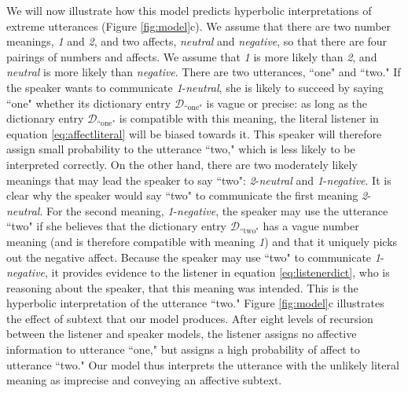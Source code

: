 \documentclass{article} %
\newcommand{\dictionary}{\ensuremath{\mathcal{D}}\xspace}
\begin{document}
We will now illustrate how this model predicts hyperbolic interpretations of extreme utterances (Figure \ref{fig:model}c). We assume that there are two number meanings, \emph{1} and \emph{2}, and two affects, \emph{neutral} and \emph{negative}, so that there are four pairings of numbers and affects. We assume that \emph{1} is more likely than \emph{2}, and \emph{neutral} is more likely than \emph{negative}. There are two utterances, ``one" and ``two." If the speaker wants to communicate \emph{1}-\emph{neutral}, she is likely to succeed by saying ``one" whether its dictionary entry $\dictionary_{\text{``one"}}$ is vague or precise: as long as the dictionary entry $\dictionary_{\text{``one"}}$ is compatible with this meaning, the literal listener in equation \ref{eq:affectliteral} will be biased towards it. This speaker will therefore assign small probability to the utterance ``two," which is less likely to be interpreted correctly. On the other hand, there are two moderately likely meanings that may lead the speaker to say ``two": \emph{2}-\emph{neutral} and \emph{1}-\emph{negative}. It is clear why the speaker would say ``two" to communicate the first meaning \emph{2}-\emph{neutral}. For the second meaning, \emph{1}-\emph{negative}, the speaker may use the utterance ``two" if she believes that the dictionary entry  $\dictionary_{\text{``two"}}$ has a vague number meaning (and is therefore compatible with meaning \emph{1}) and that it uniquely picks out the negative affect. Because the speaker may use ``two" to communicate \emph{1}-\emph{negative}, it provides evidence to the listener in equation \ref{eq:listenerdict}, who is reasoning about the speaker, that this meaning was intended. This is the hyperbolic interpretation of the utterance ``two." Figure \ref{fig:model}c illustrates the effect of subtext that our model produces. After eight levels of recursion between the listener and speaker models, the listener assigns no affective information to utterance ``one," but assigns a high probability of affect to utterance ``two." Our model thus interprets the utterance with the unlikely literal meaning as imprecise and conveying an affective subtext.

\end{document}
